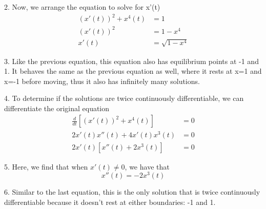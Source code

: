 \documentclass[12pt]{article}
\begin{document}
\begin{enumerate}
        2. Now, we arrange the equation to solve for x'(t)
        \begin{align*}
          (x'(t))^2 + x^4(t) & = 1            \\
          (x'(t))^2          & = 1-x^4        \\
          x'(t)              & = \sqrt{1-x^4}
        \end{align*}

        3. Like the previous equation, this equation also has equilibrium points at -1 and 1. It behaves the same as the previous equation as well, where it rests at x=1 and x=-1 before moving, thus it also has infinitely many solutions.

        4. To determine if the solutions are twice continuously differentiable, we can differentiate the original equation
        \begin{align*}
          \frac{d}{dt} [(x'(t))^2 + x^4(t)] & = 0 \\
          2x'(t)x''(t) + 4x'(t)x^3(t)       & = 0 \\
          2x'(t) [x''(t) + 2x^3(t)]         & =0
        \end{align*}

        5. Here, we find that when $x'(t) \neq{0}$, we have that
        \[
          x''(t) = -2x^3(t)
        \]

        6. Similar to the last equation, this is the only solution that is twice continuously differentiable because it doesn't rest at either boundaries: -1 and 1.
\end{enumerate}
\end{document}

